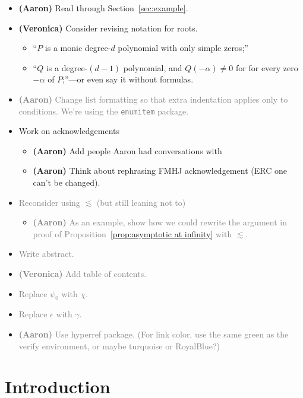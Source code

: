 \documentclass{article}
\theoremstyle{plain}
\newenvironment{brainstorm}{\color{violet}\begin{itemize}}{\end{itemize}\color{black}}
\begin{document}
\begin{brainstorm}
\item \textbf{(Aaron)} Read through Section~\ref{sec:example}.
\color{gray}
\item \textbf{(Veronica)} Consider revising notation for roots. 
\begin{itemize}
\item ``$P$ is a monic degree-$d$ polynomial with only simple zeros;''
\item ``$Q$ is a degree-$(d-1)$ polynomial, and $Q(-\alpha) \neq 0$ for for every zero $-\alpha$ of $P$;''---or even say it without formulas.
\end{itemize}
\color{violet}
\item \textcolor{gray}{\textbf{(Aaron)} Change list formatting so that extra indentation applies only to conditions. We're using the \texttt{enumitem} package.}
\item Work on acknowledgements
\begin{itemize}
\item \textbf{(Aaron)} Add people Aaron had conversations with
\item \textbf{(Aaron)} Think about rephrasing FMHJ acknowledgement (ERC one can't be changed).
\end{itemize}
\item \textcolor{gray}{Reconsider using $\lesssim$ (but still leaning not to)}
\begin{itemize}
    \item \textcolor{gray}{\textbf{(Aaron)} As an example, show how we could rewrite the argument in proof of Proposition~\ref{prop:asymptotic at infinity} with $\lesssim$.}
\end{itemize}
\item \textcolor{gray}{Write abstract.}
\item \textcolor{gray}{\textbf{(Veronica)} Add table of contents.}
\item \textcolor{gray}{Replace $\psi_0$ with $\chi$.}
\item \textcolor{gray}{Replace $\epsilon$ with $\gamma$.}
\item \textcolor{gray}{\textbf{(Aaron)} Use hyperref package. (For link color, use the same green as the verify environment, or maybe turquoise or RoyalBlue?)}
\end{brainstorm}
\section{Introduction}\label{sec:intro}
\end{document}

